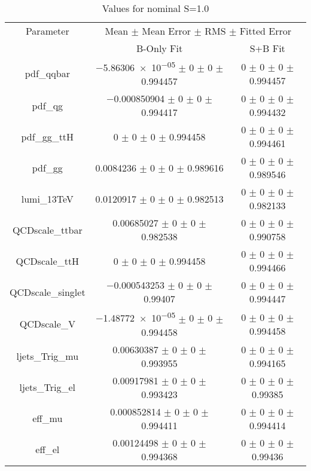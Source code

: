 \begin{table}
\centering
\caption{Values for nominal S=1.0}
\begin{tabular}{ccc}
\toprule
Parameter & \multicolumn{2}{c}{Mean $\pm$ Mean Error $\pm$ RMS $\pm$ Fitted Error}\\
 & B-Only Fit & S+B Fit\\
\midrule
pdf\_qqbar & \num{-5.86306e-05} $\pm$ \num{0} $\pm$ \num{0} $\pm$ \num{0.994457} & \num{0} $\pm$ \num{0} $\pm$ \num{0} $\pm$ \num{0.994457}\\
pdf\_qg & \num{-0.000850904} $\pm$ \num{0} $\pm$ \num{0} $\pm$ \num{0.994417} & \num{0} $\pm$ \num{0} $\pm$ \num{0} $\pm$ \num{0.994432}\\
pdf\_gg\_ttH & \num{0} $\pm$ \num{0} $\pm$ \num{0} $\pm$ \num{0.994458} & \num{0} $\pm$ \num{0} $\pm$ \num{0} $\pm$ \num{0.994461}\\
pdf\_gg & \num{0.0084236} $\pm$ \num{0} $\pm$ \num{0} $\pm$ \num{0.989616} & \num{0} $\pm$ \num{0} $\pm$ \num{0} $\pm$ \num{0.989546}\\
lumi\_13TeV & \num{0.0120917} $\pm$ \num{0} $\pm$ \num{0} $\pm$ \num{0.982513} & \num{0} $\pm$ \num{0} $\pm$ \num{0} $\pm$ \num{0.982133}\\
QCDscale\_ttbar & \num{0.00685027} $\pm$ \num{0} $\pm$ \num{0} $\pm$ \num{0.982538} & \num{0} $\pm$ \num{0} $\pm$ \num{0} $\pm$ \num{0.990758}\\
QCDscale\_ttH & \num{0} $\pm$ \num{0} $\pm$ \num{0} $\pm$ \num{0.994458} & \num{0} $\pm$ \num{0} $\pm$ \num{0} $\pm$ \num{0.994466}\\
QCDscale\_singlet & \num{-0.000543253} $\pm$ \num{0} $\pm$ \num{0} $\pm$ \num{0.99407} & \num{0} $\pm$ \num{0} $\pm$ \num{0} $\pm$ \num{0.994447}\\
QCDscale\_V & \num{-1.48772e-05} $\pm$ \num{0} $\pm$ \num{0} $\pm$ \num{0.994458} & \num{0} $\pm$ \num{0} $\pm$ \num{0} $\pm$ \num{0.994458}\\
ljets\_Trig\_mu & \num{0.00630387} $\pm$ \num{0} $\pm$ \num{0} $\pm$ \num{0.993955} & \num{0} $\pm$ \num{0} $\pm$ \num{0} $\pm$ \num{0.994165}\\
ljets\_Trig\_el & \num{0.00917981} $\pm$ \num{0} $\pm$ \num{0} $\pm$ \num{0.993423} & \num{0} $\pm$ \num{0} $\pm$ \num{0} $\pm$ \num{0.99385}\\
eff\_mu & \num{0.000852814} $\pm$ \num{0} $\pm$ \num{0} $\pm$ \num{0.994411} & \num{0} $\pm$ \num{0} $\pm$ \num{0} $\pm$ \num{0.994414}\\
eff\_el & \num{0.00124498} $\pm$ \num{0} $\pm$ \num{0} $\pm$ \num{0.994368} & \num{0} $\pm$ \num{0} $\pm$ \num{0} $\pm$ \num{0.99436}\\

\end{tabular}
\end{table}
